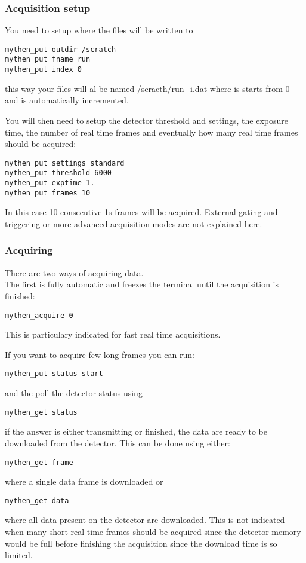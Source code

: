 \documentclass{report}
\begin{document}
\subsubsection{Acquisition setup}
You need to setup where the files will be written to
\begin{verbatim}
mythen_put outdir /scratch
mythen_put fname run
mythen_put index 0
\end{verbatim}
this way your files will al be named /scracth/run\_i.dat where is starts from 0 and is automatically incremented.

You will then need to setup the detector threshold and settings, the exposure time, the number of real time frames and eventually how many real time frames should be acquired:
\begin{verbatim}
mythen_put settings standard
mythen_put threshold 6000
mythen_put exptime 1.
mythen_put frames 10
\end{verbatim}
In this case 10 consecutive 1s frames will be acquired.
External gating and triggering or more advanced acquisition modes are not explained here.

\subsubsection{Acquiring}
There are two ways of acquiring data.\\
The first is fully automatic and freezes the terminal until the acquisition is finished:
\begin{verbatim}
mythen_acquire 0
\end{verbatim}
This is particulary indicated for fast real time acquisitions.

If you want to acquire few long frames you can run:
\begin{verbatim}
mythen_put status start
\end{verbatim}
and the poll the detector status using
\begin{verbatim}
mythen_get status 
\end{verbatim}
if the answer is either transmitting or finished, the data are ready to be downloaded from the detector.
This can be done using either:
\begin{verbatim}
mythen_get frame
\end{verbatim}
where a single data frame is downloaded or
\begin{verbatim}
mythen_get data
\end{verbatim}
where all data present on the detector are downloaded.
This is not indicated when many short real time frames should be acquired since the detector memory would be full before finishing the acquisition since the download time is so limited.
\end{document}
